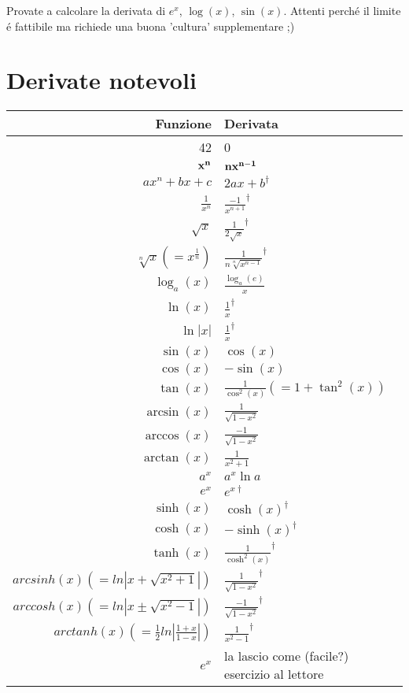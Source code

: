 \begin{esercizio}
Provate a calcolare la derivata di $e^x$, $\log(x)$, $\sin(x)$. Attenti perch\'e il limite \'e fattibile ma richiede una
buona 'cultura' supplementare ;)
\end{esercizio}

\section{Derivate notevoli}

\begin{tabular}{|r|l|}
\hline
Funzione & Derivata\\
\hline
\hline
42 & 0 \\
$ \bf{x^n} $ & $ \bf{nx^{n-1}}$ \\
$ax^n+bx+c$ & $2ax+b^\dagger$ \\
$\frac{1}{x^n}$ & $\frac{-1}{x^{n+1}}^\dagger$ \\
$\sqrt{x}$ & $\frac{1}{2\sqrt{x}}^\dagger$ \\
$\sqrt[n]{x} (=x^{\frac{1}{n}})$ & $\frac{1}{n\sqrt[n]{x^{n-1}}}^\dagger$ \\
\hline
$\log_a(x)$ & $\frac{\log_a(e)}{x}$ \\
$\ln(x)$ & $\frac{1}{x} ^\dagger$ \\
$\ln|x|$ & $\frac{1}{x} ^\dagger$ \\
\hline
$\sin(x)$ & $\cos(x)$ \\
$\cos(x)$ & $-\sin(x)$ \\
$\tan(x)$ & $\frac{1}{\cos^2(x)} (=1+\tan^2(x))$ \\
\hline
$\arcsin(x)$ & $\frac{1}{\sqrt{1-x^2}}$ \\
$\arccos(x)$ & $\frac{-1}{\sqrt{1-x^2}}$ \\
$\arctan(x)$ & $\frac{1}{x^2+1}$ \\
\hline
$a^x$ & $a^x \ln a$ \\
$e^x$ & $e^{x \dagger}$\\
\hline
$\sinh(x)$ & $\cosh(x)^\dagger$ \\
$\cosh(x)$ & $-\sinh(x)^\dagger$ \\
$\tanh(x)$ & $\frac{1}{\cosh^2(x)}^\dagger$ \\
\hline
$arcsinh(x) (= ln|x + \sqrt{x^2+1}|)$ & $\frac{1}{\sqrt{1-x^2}} ^\dagger$ \\
$arccosh(x) (= ln|x \pm \sqrt{x^2-1}|)$ & $\frac{-1}{\sqrt{1-x^2}} ^\dagger$ \\
$arctanh(x) (= \frac{1}{2} ln|\frac{1+x}{1-x}|)$ & $\frac{1}{x^2-1} ^\dagger$ \\
\hline
$e^x$ & la lascio come (facile?) esercizio al lettore \\
\hline
\end{tabular}


